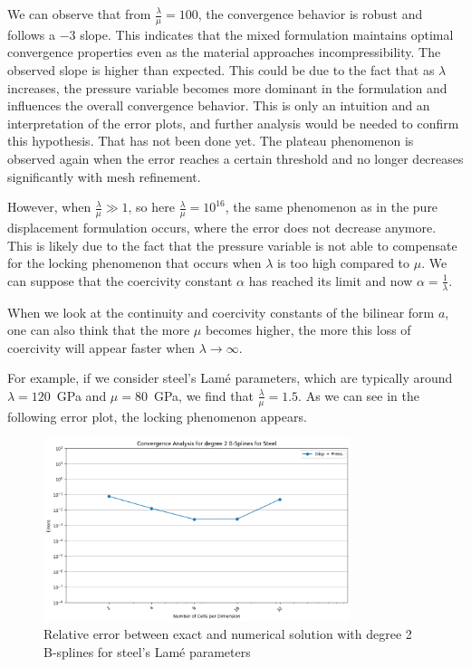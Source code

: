 \documentclass[a4paper,12pt,twoside]{report}
\begin{document}
We can observe that from $\frac{\lambda}{\mu} = 100$, the convergence behavior is robust and follows a $-3$ slope. This indicates that the mixed formulation maintains optimal convergence properties even as the material approaches incompressibility. The observed slope is higher than expected. This could be due to the fact that as $\lambda$ increases, the pressure variable becomes more dominant in the formulation and influences the overall convergence behavior. This is only an intuition and an interpretation of the error plots, and further analysis would be needed to confirm this hypothesis. That has not been done yet.
The plateau phenomenon is observed again when the error reaches a certain threshold and no longer decreases significantly with mesh refinement.

However, when $\frac{\lambda}{\mu} \gg 1$, so here $\frac{\lambda}{\mu} = 10^{16}$, the same phenomenon as in the pure displacement formulation occurs, where the error does not decrease anymore. This is likely due to the fact that the pressure variable is not able to compensate for the locking phenomenon that occurs when $\lambda$ is too high compared to $\mu$. We can suppose that the coercivity constant $\alpha$ has reached its limit and now $\alpha = \frac{1}{\lambda}$.

When we look at the continuity and coercivity constants of the bilinear form $a$, one can also think that the more $\mu$ becomes higher, the more this loss of coercivity will appear faster when $\lambda \rightarrow \infty$.

For example, if we consider steel's Lamé parameters, which are typically around $\lambda = 120$~GPa and $\mu = 80$~GPa, we find that $\frac{\lambda}{\mu} = 1.5$. As we can see in the following error plot, the locking phenomenon appears.

\begin{figure}[!h]
	\centering
	\includegraphics[width=0.8\textwidth]{figures/figures_mixed_DH/sum_convergence_plot_degree_2_lambda=120000000000.0.png}
	\caption{Relative error between exact and numerical solution with degree 2 B-splines for steel's Lamé parameters}
	\label{fig:convergencedegree2mixeddirichlethomogeneoussteel}
\end{figure}
\end{document}
